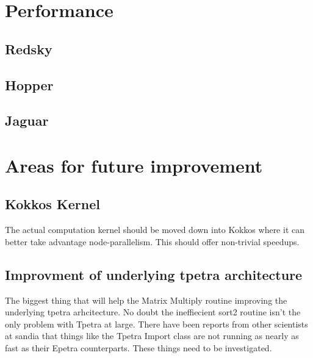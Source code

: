 \documentclass{article}
\begin{document}
\section{Performance}

\subsection{Redsky}

\subsection{Hopper}

\subsection{Jaguar}


\section{Areas for future improvement}
\subsection{Kokkos Kernel}
The actual computation kernel should be moved down into Kokkos where it can better take advantage node-parallelism. This should offer non-trivial speedups.

\subsection{Improvment of underlying tpetra architecture}
The biggest thing that will help the Matrix Multiply routine improving the underlying tpetra arhcitecture. No doubt the ineffiecient sort2 routine isn't the
only problem with Tpetra at large. There have been reports from other scientists at sandia that things like the Tpetra Import class are not running as
nearly as fast as their Epetra counterparts. These things need to be investigated.
\end{document}
